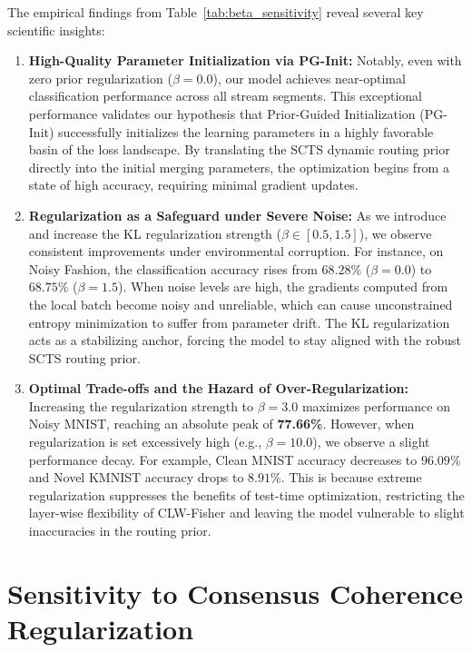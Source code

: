 \documentclass{article}
\theoremstyle{plain}
\theoremstyle{definition}
\theoremstyle{remark}
\begin{document}
The empirical findings from Table~\ref{tab:beta_sensitivity} reveal several key scientific insights:
\begin{enumerate}
  \item \textbf{High-Quality Parameter Initialization via PG-Init:} Notably, even with zero prior regularization ($\beta=0.0$), our model achieves near-optimal classification performance across all stream segments. This exceptional performance validates our hypothesis that Prior-Guided Initialization (PG-Init) successfully initializes the learning parameters in a highly favorable basin of the loss landscape. By translating the SCTS dynamic routing prior directly into the initial merging parameters, the optimization begins from a state of high accuracy, requiring minimal gradient updates.
  \item \textbf{Regularization as a Safeguard under Severe Noise:} As we introduce and increase the KL regularization strength ($\beta \in [0.5, 1.5]$), we observe consistent improvements under environmental corruption. For instance, on Noisy Fashion, the classification accuracy rises from $68.28\%$ ($\beta=0.0$) to $68.75\%$ ($\beta=1.5$). When noise levels are high, the gradients computed from the local batch become noisy and unreliable, which can cause unconstrained entropy minimization to suffer from parameter drift. The KL regularization acts as a stabilizing anchor, forcing the model to stay aligned with the robust SCTS routing prior.
  \item \textbf{Optimal Trade-offs and the Hazard of Over-Regularization:} Increasing the regularization strength to $\beta = 3.0$ maximizes performance on Noisy MNIST, reaching an absolute peak of \textbf{77.66\%}. However, when regularization is set excessively high (e.g., $\beta = 10.0$), we observe a slight performance decay. For example, Clean MNIST accuracy decreases to $96.09\%$ and Novel KMNIST accuracy drops to $8.91\%$. This is because extreme regularization suppresses the benefits of test-time optimization, restricting the layer-wise flexibility of CLW-Fisher and leaving the model vulnerable to slight inaccuracies in the routing prior.
\end{enumerate}

\section{Sensitivity to Consensus Coherence Regularization}
\label{sec:appendix_gamma}
\end{document}
